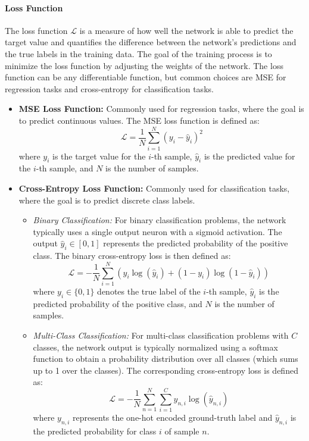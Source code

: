 \paragraph{Loss Function}
The loss function $\mathcal{L}$ is a measure of how well the network is able to predict the target value and quantifies the difference between the network's predictions and the true labels in the training data. The goal of the training process is to minimize the loss function by adjusting the weights of the network. The loss function can be any differentiable function, but common choices are \acf{MSE} for regression tasks and cross-entropy for classification tasks.
\begin{itemize}
	\item \textbf{\acf{MSE} Loss Function:} Commonly used for regression tasks, where the goal is to predict continuous values. The \acf{MSE} loss function is defined as:
	\begin{equation}
		\mathcal{L} = \frac{1}{N} \sum_{i=1}^{N} (y_i - \hat{y}_i)^2
	\end{equation}
	where $y_i$ is the target value for the $i$-th sample, $\hat{y}_i$ is the predicted value for the $i$-th sample, and $N$ is the number of samples.
	

	\item \textbf{Cross-Entropy Loss Function:} Commonly used for classification tasks, where the goal is to predict discrete class labels. 
	\begin{itemize}
		\item \textit{Binary Classification:} For binary classification problems, the network typically uses a single output neuron with a sigmoid activation. The output $\hat{y}_i \in [0,1]$ represents the predicted probability of the positive class. The binary cross-entropy loss is then defined as:
		\begin{equation}
			\mathcal{L} =
			-\frac{1}{N}\sum_{i=1}^{N}
			\left(
			y_i \log(\hat{y}_i) + (1 - y_i)\log(1 - \hat{y}_i)
			\right)
		\end{equation}
		where $y_i \in \{0,1\}$ denotes the true label of the $i$-th sample, $\hat{y}_i$ is the predicted probability of the positive class, and $N$ is the number of samples.

		\item \textit{Multi-Class Classification:} For multi-class classification problems with $C$ classes, the network output is typically normalized using a softmax function to obtain a probability distribution over all classes (which sums up to 1 over the classes). The corresponding cross-entropy loss is defined as:
		\begin{equation}
			\mathcal{L} =
			-\frac{1}{N}\sum_{n=1}^{N}\sum_{i=1}^{C}
			y_{n,i}\log(\hat{y}_{n,i})
		\end{equation}
		where $y_{n,i}$ represents the one-hot encoded ground-truth label and $\hat{y}_{n,i}$ is the predicted probability for class $i$ of sample $n$.
	\end{itemize}

\end{itemize}
